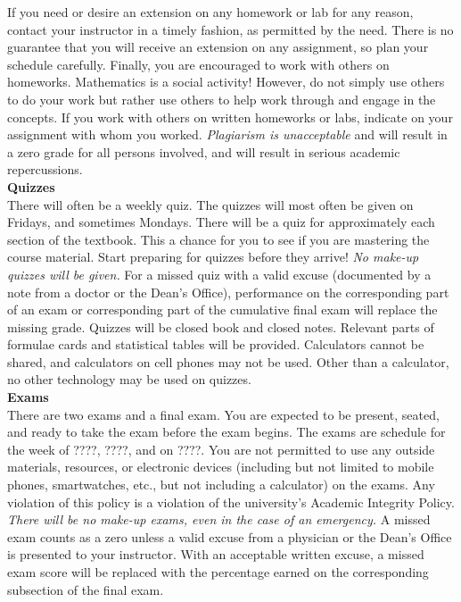 \documentclass[11pt,letterpaper]{article}
\newcommand{\lefthead}[2]{\noindent\textbf{#1}\hfill\\[#2]}
\begin{document}
\noindent If you need or desire an extension on any homework or lab for any reason, contact your instructor in a timely fashion, as permitted by the need. There is no guarantee that you will receive an extension on any assignment, so plan your schedule carefully. Finally, you are encouraged to work with others on homeworks. Mathematics is a social activity! However, do not simply use others to do your work but rather use others to help work through and engage in the concepts. If you work with others on written homeworks or labs, indicate on your assignment with whom you worked. \emph{Plagiarism is unacceptable} and will result in a zero grade for all persons involved, and will result in serious academic repercussions. \\[0.3cm]





\lefthead{Quizzes}{0.3cm}
\noindent There will often be a weekly quiz. The quizzes will most often be given on Fridays, and sometimes Mondays. There will be a quiz for approximately each section of the textbook. This a chance for you to see if you are mastering the course material. Start preparing for quizzes before they arrive! \emph{No make-up quizzes will be given.} For a missed quiz with a valid excuse (documented by a note from a doctor or the Dean's Office), performance on the corresponding part of an exam or corresponding part of the cumulative final exam will replace the missing grade. Quizzes will be closed book and closed notes. Relevant parts of formulae cards and statistical tables will be provided. Calculators cannot be shared, and calculators on cell phones may not be used. Other than a calculator, no other technology may be used on quizzes. \\[0.3cm]





\lefthead{Exams}{0.3cm}
\noindent There are two exams and a final exam. You are expected to be present, seated, and ready to take the exam before the exam begins. The exams are schedule for the week of ????, ????, and on ????. You are not permitted to use any outside materials, resources, or electronic devices (including but not limited to mobile phones, smartwatches, etc., but not including a calculator) on the exams. Any violation of this policy is a violation of the university's Academic Integrity Policy. \\

\noindent \emph{There will be no make-up exams, even in the case of an emergency.} A missed exam counts as a zero unless a valid excuse from a physician or the Dean's Office is presented to your instructor. With an acceptable written excuse, a missed exam score will be replaced with the percentage earned on the corresponding subsection of the final exam. \\
\end{document}
